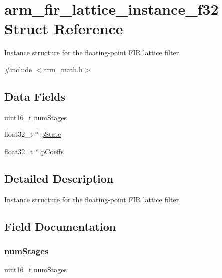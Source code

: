 \hypertarget{structarm__fir__lattice__instance__f32}{}\section{arm\+\_\+fir\+\_\+lattice\+\_\+instance\+\_\+f32 Struct Reference}
\label{structarm__fir__lattice__instance__f32}


Instance structure for the floating-\/point F\+IR lattice filter.  




{\ttfamily \#include $<$arm\+\_\+math.\+h$>$}

\subsection*{Data Fields}
\begin{DoxyCompactItemize}
\item 
uint16\+\_\+t \mbox{\hyperlink{structarm__fir__lattice__instance__f32_a4cceb90547b3e585d4c7aabaa8057212}{num\+Stages}}
\item 
float32\+\_\+t $\ast$ \mbox{\hyperlink{structarm__fir__lattice__instance__f32_a335c87e6fdc4b96601d95a5de8b9c463}{p\+State}}
\item 
float32\+\_\+t $\ast$ \mbox{\hyperlink{structarm__fir__lattice__instance__f32_aacbb8dd8eeba4b21fc2bb40076405ee3}{p\+Coeffs}}
\end{DoxyCompactItemize}


\subsection{Detailed Description}
Instance structure for the floating-\/point F\+IR lattice filter. 

\subsection{Field Documentation}
\mbox{\label{structarm__fir__lattice__instance__f32_a4cceb90547b3e585d4c7aabaa8057212}} 
\subsubsection{\texorpdfstring{num\+Stages}{numStages}}
{\footnotesize\ttfamily uint16\+\_\+t num\+Stages}

